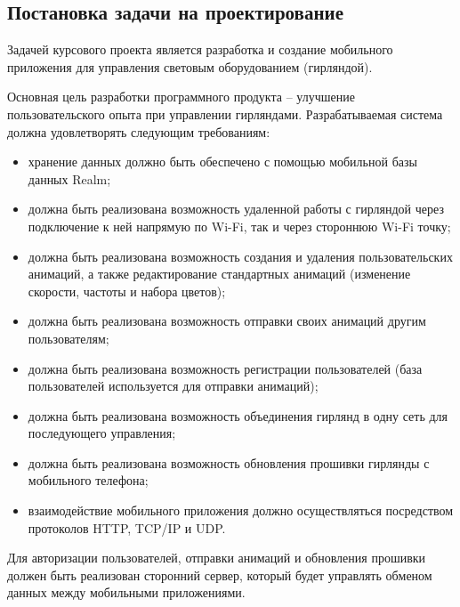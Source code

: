 \subsection{Постановка задачи на проектирование}
\label{sec:develop:task}

Задачей курсового проекта является разработка и создание мобильного приложения для управления световым оборудованием (гирляндой). 

Основная цель разработки программного продукта – улучшение пользовательского опыта при управлении гирляндами.
Разрабатываемая система должна удовлетворять следующим требованиям:
\begin{itemize}
	\item хранение данных должно быть обеспечено с помощью мобильной базы данных Realm;
	\item должна быть реализована возможность удаленной работы с гирляндой через подключение к ней напрямую по Wi-Fi, так и через стороннюю Wi-Fi точку;
	\item должна быть реализована возможность создания и удаления пользовательских анимаций, а также редактирование стандартных анимаций (изменение скорости, частоты и набора цветов);
	\item должна быть реализована возможность отправки своих анимаций другим пользователям;
	\item должна быть реализована возможность регистрации пользователей (база пользователей используется для отправки анимаций);
	\item должна быть реализована возможность объединения гирлянд в одну сеть для последующего управления;
	\item должна быть реализована возможность обновления прошивки гирлянды с мобильного телефона;
	\item взаимодействие мобильного приложения должно осуществляться посредством протоколов HTTP, TCP/IP и UDP.
\end{itemize}

Для авторизации пользователей, отправки анимаций и обновления прошивки должен быть реализован сторонний сервер, который будет управлять обменом данных между мобильными приложениями.
